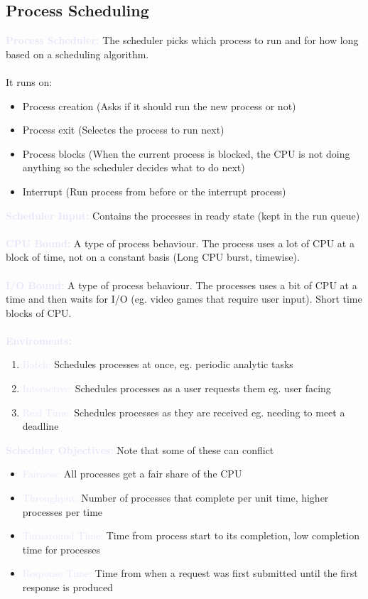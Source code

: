 \documentclass[a4paper,10pt]{article}
\begin{document}
\subsection{Process Scheduling}
\textcolor{Lavender}{\textbf{Process Scheduler:}} The scheduler picks which process to run and for how long based on a scheduling algorithm. \\\\
It runs on: 
\begin{itemize}
\item Process creation (Asks if it should run the new process or not)
\item Process exit (Selectes the process to run next)
\item Process blocks (When the current process is blocked, the CPU is not doing anything so the scheduler decides what to do next)
\item Interrupt (Run process from before or the interrupt process)
\end{itemize}
\textcolor{Lavender}{\textbf{Scheduler Input:}} Contains the processes in ready state (kept in the run queue) \\\\
\textcolor{Lavender}{\textbf{CPU Bound:}} A type of process behaviour. The process uses a lot of CPU at a block of time, not on a constant basis (Long CPU burst, timewise). \\\\
\textcolor{Lavender}{\textbf{I/O Bound:}} A type of process behaviour. The processes uses a bit of CPU at a time and then waits for I/O (eg. video games that require user input). Short time blocks of CPU. \\\\
\textcolor{Lavender}{\textbf{Enviroments:}}
\begin{enumerate}
\item \textcolor{Lavender}{Batch:} Schedules processes at once, eg. periodic analytic tasks
\item \textcolor{Lavender}{Interactive:} Schedules processes as a user requests them eg. user facing 
\item \textcolor{Lavender}{Real Time:} Schedules processes as they are received eg. needing to meet a deadline \\
\end{enumerate}
\textcolor{Lavender}{\textbf{Scheduler Objectives:}} Note that some of these can conflict 
\begin{itemize}
\item \textcolor{Lavender}{Fairness:} All processes get a fair share of the CPU
\item \textcolor{Lavender}{Throughput:} Number of processes that complete per unit time, higher processes per time 
\item \textcolor{Lavender}{Turnaround Time:} Time from process start to its completion, low completion time for processes
\item \textcolor{Lavender}{Response Time:} Time from when a request was first submitted until the first response is produced \\
\end{itemize}
\end{document}
